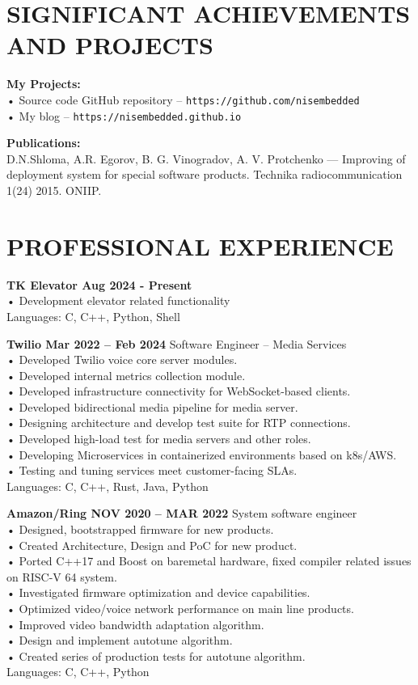 \documentclass{article}
\begin{document}
\section{\textsf{SIGNIFICANT ACHIEVEMENTS AND PROJECTS}}

\textbf{My Projects:}\\
• Source code GitHub repository – \texttt{https://github.com/nisembedded}\\
• My blog – \texttt{https://nisembedded.github.io}

\bigskip\noindent
\textbf{Publications:}\\
D.N.Shloma, A.R. Egorov, B. G. Vinogradov, A. V. Protchenko — Improving of deployment
system for special software products. Technika radiocommunication 1(24) 2015. ONIIP.

\section{\textsf{PROFESSIONAL EXPERIENCE}}
\textbf{TK Elevator Aug 2024 - Present}\\
• Development elevator related functionality\\
Languages: C, C++, Python, Shell

\bigskip\noindent
\textbf{Twilio Mar 2022 – Feb 2024}
Software Engineer – Media Services\\
• Developed Twilio voice core server modules.\\
• Developed internal metrics collection module.\\
• Developed infrastructure connectivity for WebSocket-based clients.\\
• Developed bidirectional media pipeline for media server.\\
• Designing architecture and develop test suite for RTP connections.\\
• Developed high-load test for media servers and other roles.\\
• Developing Microservices in containerized environments based on k8s/AWS.\\
• Testing and tuning services meet customer-facing SLAs.\\
Languages: C, C++, Rust, Java, Python

\bigskip\noindent
\textbf{Amazon/Ring NOV 2020 – MAR 2022}
System software engineer\\
• Designed, bootstrapped firmware for new products.\\
• Created Architecture, Design and PoC for new product.\\
• Ported C++17 and Boost on baremetal hardware, fixed compiler related issues on RISC-V 64 system.\\
• Investigated firmware optimization and device capabilities.\\
• Optimized video/voice network performance on main line products.\\
• Improved video bandwidth adaptation algorithm.\\
• Design and implement autotune algorithm.\\
• Created series of production tests for autotune algorithm.\\
Languages: C, C++, Python
\end{document}
